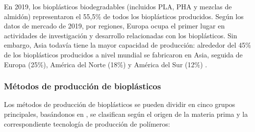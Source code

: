 \documentclass[14pt,oneside]{extarticle} %
\begin{document}
En 2019, los bioplásticos biodegradables (incluidos PLA, PHA y mezclas de  almidón) representaron el 55,5\% de todos los bioplásticos producidos. Según los  datos de mercado de 2019, por regiones, Europa ocupa el primer lugar en actividades  de investigación y desarrollo relacionadas con los bioplásticos. Sin embargo, Asia  todavía tiene la mayor capacidad de producción: alrededor del 45\% de los bioplásticos  producidos a nivel mundial se fabricaron en Asia, seguida de Europa (25\%), América  del Norte (18\%) y América del Sur (12\%) \cite{dang2022}.

\subsubsection{Métodos de producción de bioplásticos}

Los métodos de producción de bioplásticos se pueden dividir en cinco grupos principales, basándonos en \cite{joogi2020}, se clasifican según el origen de la materia prima y la correspondiente tecnología de producción de polímeros:
\end{document}
